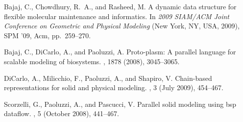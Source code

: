 
\begin{thebibliography}{10}
{\sc Bajaj, C., Chowdhury, R.~A., and Rasheed, M.}
\newblock A dynamic data structure for flexible molecular maintenance and informatics.
\newblock In {\em 2009 SIAM/ACM Joint Conference on Geometric and Physical Modeling\/} (New York, NY, {USA}, 2009), SPM '09, Acm, pp.~259--270.

{\sc Bajaj, C., DiCarlo, A., and Paoluzzi, A.}
\newblock Proto-plasm: A parallel language for scalable modeling of biosystems.
, 1878 (2008), 3045--3065.

{\sc DiCarlo, A., Milicchio, F., Paoluzzi, A., and Shapiro, V.}
\newblock Chain-based representations for solid and physical modeling.
, 3 (July 2009), 454--467.

{\sc Scorzelli, G., Paoluzzi, A., and Pascucci, V.}
\newblock Parallel solid modeling using bsp dataflow.
, 5 (October 2008), 441--467.
\end{thebibliography}
